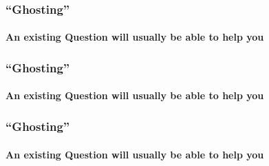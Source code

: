 \documentclass{beamer}
\begin{document}
  \begin{frame}  
    \frametitle{``Ghosting''}
    \framesubtitle{An existing Question will usually be able to help you}
    
    \begin{center}
     
      
    \end{center}  
  \end{frame}
  \begin{frame}  
    \frametitle{``Ghosting''}
    \framesubtitle{An existing Question will usually be able to help you}
    
    \begin{center}
     
      
    \end{center}  
  \end{frame}
  \begin{frame}  
    \frametitle{``Ghosting''}
    \framesubtitle{An existing Question will usually be able to help you}
    
    \begin{center}
     
      
    \end{center}  
  \end{frame}
\end{document}
